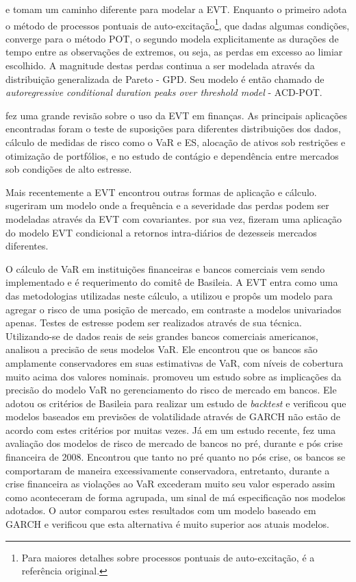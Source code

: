 \documentclass[1p]{elsarticle}
\theoremstyle{definition}
\begin{document}
\cite{Chavez-Demoulin2005} e \cite{Herrera2013} tomam um caminho diferente para modelar a EVT. Enquanto o primeiro adota o método de processos pontuais de auto-excitação\footnote{Para maiores detalhes sobre processos pontuais de auto-excitação, \cite{Hawkes1971} é a referência original.}, que dadas algumas condições, converge para o método POT, o segundo modela explicitamente as durações de tempo entre as observações de extremos, ou seja, as perdas em excesso ao limiar escolhido. A magnitude destas perdas continua a ser modelada através da distribuição generalizada de Pareto - GPD. Seu modelo é então chamado de \emph{autoregressive conditional duration peaks over threshold model} - ACD-POT.

\cite{Rocco2014} fez uma grande revisão sobre o uso da EVT em finanças. As principais aplicações encontradas  foram o teste de suposições para diferentes distribuições dos dados, cálculo de medidas de risco como o VaR e ES, alocação de ativos sob restrições e otimização de portfólios, e no estudo de contágio e dependência entre mercados sob condições de alto estresse.

Mais recentemente a EVT encontrou outras formas de aplicação e cálculo. \cite{Chavez-Demoulin2016} sugeriram um modelo onde a frequência e a severidade das perdas podem ser modeladas através da EVT com covariantes.  \cite{Karmakar2016} por sua vez, fizeram uma aplicação do modelo EVT condicional a retornos intra-diários de dezesseis mercados diferentes.

O cálculo de VaR em instituições financeiras e bancos comerciais vem sendo implementado e é requerimento do comitê de Basileia. A EVT entra como uma das metodologias utilizadas neste cálculo,  \cite{Longin2000} a utilizou e propôs um modelo para agregar o risco de uma posição de mercado, em contraste a modelos univariados apenas. Testes de estresse podem ser realizados através de sua técnica. Utilizando-se de dados reais de seis grandes bancos comerciais americanos, \cite{Berkowitz2002} analisou a precisão de seus modelos VaR. Ele encontrou que os bancos são amplamente conservadores em suas estimativas de VaR, com níveis de cobertura muito acima dos valores nominais. \cite{Wong2003} promoveu um estudo sobre as implicações da precisão do modelo VaR no gerenciamento do risco de mercado em bancos. Ele adotou os critérios de Basileia para realizar um estudo de \emph{backtest} e verificou que modelos baseados em previsões de volatilidade através de GARCH não estão de acordo com estes critérios por muitas vezes. Já em um estudo recente, \cite{OBrien2017} fez uma avaliação dos modelos de risco de mercado de bancos no pré, durante e pós crise financeira de 2008. Encontrou que tanto no pré quanto no pós crise, os bancos se comportaram de maneira excessivamente conservadora, entretanto, durante a crise financeira as violações ao VaR excederam muito seu valor esperado assim como aconteceram de forma agrupada, um sinal de má especificação nos modelos adotados. O autor comparou estes resultados com um modelo baseado em GARCH e verificou que esta alternativa é muito superior aos atuais modelos.
\end{document}
